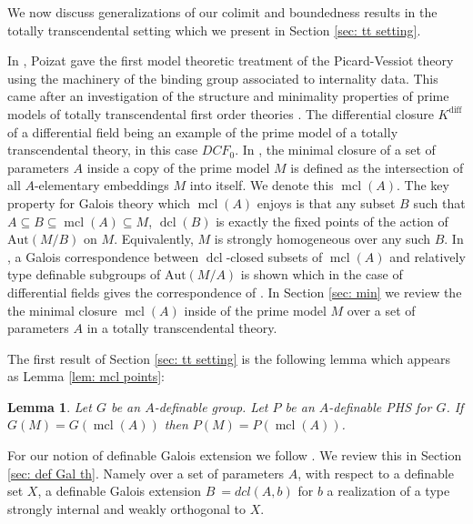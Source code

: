 \documentclass{amsart}
\newtheorem{lemma}[theorem]{Lemma}
\theoremstyle{definition}
\theoremstyle{remark}
\numberwithin{equation}{section}
\def \diff {\operatorname{diff}}
\def \aut {\text{Aut}}
\def \mcl {\operatorname{mcl}}
\def \dcl {\operatorname{dcl}}
\begin{document}
We now discuss generalizations of our colimit and boundedness results in the totally transcendental setting which we present in Section \ref{sec: tt setting}.

In \cite{poizatimaginare}, Poizat gave the first model theoretic treatment of the Picard-Vessiot theory using the machinery of the binding group associated to internality data. This came after an investigation of the structure and minimality properties of prime models of totally transcendental first order theories \cite{PoizatPrime}.  The differential closure $K^{\diff}$ of a differential field being an example of the prime model of a totally transcendental theory, in this case $DCF_0$. In \cite{PoizatPrime}, the minimal closure of a set of parameters $A$ inside a copy of the prime model $M$ is defined as the intersection of all $A$-elementary embeddings $M$ into itself. We denote this $\mcl(A)$. The key property for Galois theory which $\mcl(A)$ enjoys is that any subset $B$ such that $A \subseteq B \subseteq \mcl(A) \subseteq M$, $\dcl(B)$ is exactly the fixed points of the action of $\aut(M/B)$ on $M$. Equivalently, $M$ is strongly homogeneous over any such $B$. In \cite{meretzky2026galoistheoryautomorphismgroups}, a Galois correspondence between $\dcl$-closed subsets of $\mcl(A)$ and relatively type definable subgroups of $\aut(M/A)$ is shown which in the case of differential fields gives the correspondence of \cite{magid2022completepicardvessiotclosure}.  In Section \ref{sec: min} we review the the minimal closure $\mcl(A)$ inside of  the prime model $M$ over a set of parameters $A$ in a totally transcendental theory. 

The first result of Section \ref{sec: tt setting} is the following lemma which appears as Lemma \ref{lem: mcl points}:

\begin{lemma}\relax
    Let $G$ be an $A$-definable group. Let $P$ be an $A$-definable PHS for $G$. If $G(M) = G(\mcl(A))$ then $P(M) = P(\mcl(A))$. 
\end{lemma} 

For our notion of definable Galois extension we follow \cite{OmarAnand}. We review this in Section \ref{sec: def Gal th}. Namely over a set of parameters $A$, with respect to a definable set $X$, a definable Galois extension $B\ = dcl(A,b)$ for $b$ a realization of a type strongly internal and weakly orthogonal to $X$. 
\end{document}

